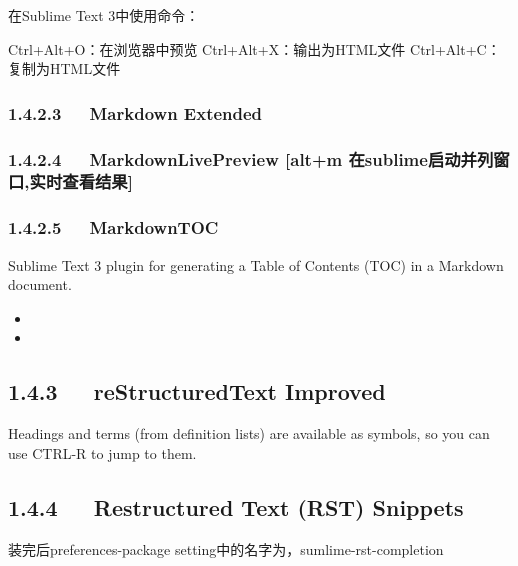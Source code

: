 \documentclass[letterpaper,12pt,english]{sphinxmanual}
\begin{document}
在Sublime Text 3中使用命令：

\begin{sphinxVerbatim}[commandchars=\\\{\}]
Ctrl+Alt+O：在浏览器中预览
Ctrl+Alt+X：输出为HTML文件
Ctrl+Alt+C：复制为HTML文件
\end{sphinxVerbatim}


\subsubsection{1.4.2.3   Markdown Extended}
\label{\detokenize{001software/001install/sublime:markdown-extended}}

\subsubsection{1.4.2.4   MarkdownLivePreview {[}alt+m 在sublime启动并列窗口,实时查看结果{]}}
\label{\detokenize{001software/001install/sublime:markdownlivepreview-alt-m-sublime}}

\subsubsection{1.4.2.5   MarkdownTOC}
\label{\detokenize{001software/001install/sublime:markdowntoc}}
Sublime Text 3 plugin for generating a Table of Contents (TOC) in a
Markdown document.
\begin{itemize}
\item {} 

\item {} 

\end{itemize}


\subsection{1.4.3   reStructuredText Improved}
\label{\detokenize{001software/001install/sublime:restructuredtext-improved}}
Headings and terms (from definition lists) are available as symbols, so
you can use CTRL-R to jump to them.


\subsection{1.4.4   Restructured Text (RST) Snippets}
\label{\detokenize{001software/001install/sublime:restructured-text-rst-snippets}}
装完后preferences-package setting中的名字为，sumlime-rst-completion
\end{document}

